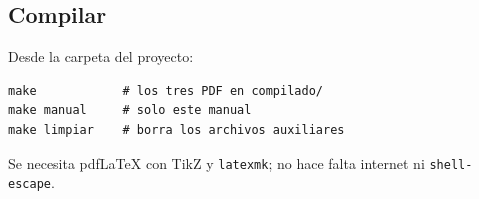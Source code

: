 \subsection{Compilar}
Desde la carpeta del proyecto:
\begin{Verbatim}[fontsize=\small,frame=single]
make            # los tres PDF en compilado/
make manual     # solo este manual
make limpiar    # borra los archivos auxiliares
\end{Verbatim}
Se necesita pdf\LaTeX{} con TikZ y \texttt{latexmk}; no hace falta internet ni
\texttt{shell-escape}.
